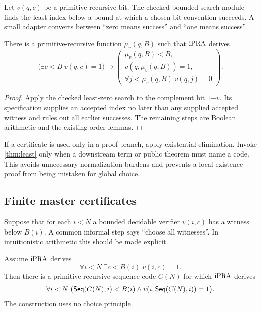 Let \(v(q,c)\) be a primitive-recursive bit.  The checked bounded-search module
finds the least index below a bound at which a chosen bit convention succeeds.
A small adapter converts between ``zero means success'' and ``one means
success''.

\begin{theorem}
\label{thm:least}
There is a primitive-recursive function \(\mu_v(q,B)\) such that \(\mathrm{iPRA}\)
derives
\[
 \bigl(\exists c<B\;v(q,c)=1\bigr)
 \longrightarrow
 \left(
 \begin{array}{l}
 \mu_v(q,B)<B,\\[-2pt]
 v(q,\mu_v(q,B))=1,\\[-2pt]
 \forall j<\mu_v(q,B)\;v(q,j)=0
 \end{array}
 \right).
\]
\end{theorem}

\begin{proof}
Apply the checked least-zero search to the complement bit
\(1\mathbin{\dot-}v\).  Its specification supplies an accepted index no later
than any supplied accepted witness and rules out all earlier successes.  The
remaining steps are Boolean arithmetic and the existing order lemmas.
\end{proof}

\begin{principle}
If a certificate is used only in a proof branch, apply existential elimination.
Invoke \cref{thm:least} only when a downstream term or public theorem must name
a code.  This avoids unnecessary normalization burdens and prevents a local
existence proof from being mistaken for global choice.
\end{principle}

\subsection{Finite master certificates}

Suppose that for each \(i<N\) a bounded decidable verifier \(v(i,c)\) has a
witness below \(B(i)\).  A common informal step says ``choose all witnesses''.
In intuitionistic arithmetic this should be made explicit.

\begin{theorem}
\label{thm:master}
Assume \(\mathrm{iPRA}\) derives
\[
       \forall i<N\;\exists c<B(i)\;v(i,c)=1.
\]
Then there is a primitive-recursive sequence code \(C(N)\) for which \(\mathrm{iPRA}\)
derives
\[
       \forall i<N\;
       \bigl(\mathsf{Seq}(C(N),i)<B(i)\wedge
             v(i,\mathsf{Seq}(C(N),i))=1\bigr).
\]
The construction uses no choice principle.
\end{theorem}

